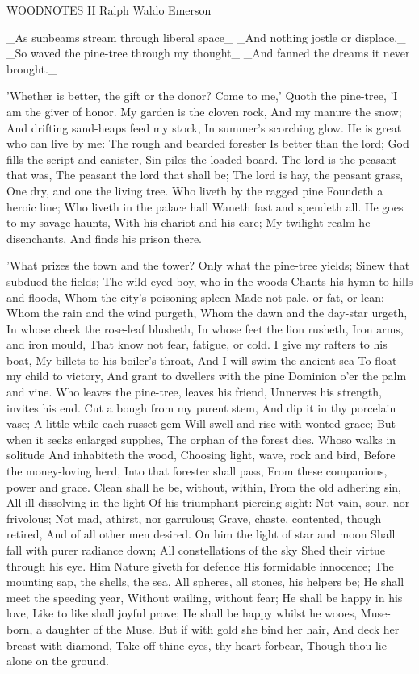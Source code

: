 WOODNOTES II
Ralph Waldo Emerson

_As sunbeams stream through liberal space_
_And nothing jostle or displace,_
_So waved the pine-tree through my thought_
_And fanned the dreams it never brought._

'Whether is better, the gift or the donor?
Come to me,'
Quoth the pine-tree,
'I am the giver of honor.
My garden is the cloven rock,
And my manure the snow;
And drifting sand-heaps feed my stock,
In summer's scorching glow.
He is great who can live by me:
The rough and bearded forester
Is better than the lord;
God fills the script and canister,
Sin piles the loaded board.
The lord is the peasant that was,
The peasant the lord that shall be;
The lord is hay, the peasant grass,
One dry, and one the living tree.
Who liveth by the ragged pine
Foundeth a heroic line;
Who liveth in the palace hall
Waneth fast and spendeth all.
He goes to my savage haunts,
With his chariot and his care;
My twilight realm he disenchants,
And finds his prison there.

'What prizes the town and the tower?
Only what the pine-tree yields;
Sinew that subdued the fields;
The wild-eyed boy, who in the woods
Chants his hymn to hills and floods,
Whom the city's poisoning spleen
Made not pale, or fat, or lean;
Whom the rain and the wind purgeth,
Whom the dawn and the day-star urgeth,
In whose cheek the rose-leaf blusheth,
In whose feet the lion rusheth,
Iron arms, and iron mould,
That know not fear, fatigue, or cold.
I give my rafters to his boat,
My billets to his boiler's throat,
And I will swim the ancient sea
To float my child to victory,
And grant to dwellers with the pine
Dominion o'er the palm and vine.
Who leaves the pine-tree, leaves his friend,
Unnerves his strength, invites his end.
Cut a bough from my parent stem,
And dip it in thy porcelain vase;
A little while each russet gem
Will swell and rise with wonted grace;
But when it seeks enlarged supplies,
The orphan of the forest dies.
Whoso walks in solitude
And inhabiteth the wood,
Choosing light, wave, rock and bird,
Before the money-loving herd,
Into that forester shall pass,
From these companions, power and grace.
Clean shall he be, without, within,
From the old adhering sin,
All ill dissolving in the light
Of his triumphant piercing sight:
Not vain, sour, nor frivolous;
Not mad, athirst, nor garrulous;
Grave, chaste, contented, though retired,
And of all other men desired.
On him the light of star and moon
Shall fall with purer radiance down;
All constellations of the sky
Shed their virtue through his eye.
Him Nature giveth for defence
His formidable innocence;
The mounting sap, the shells, the sea,
All spheres, all stones, his helpers be;
He shall meet the speeding year,
Without wailing, without fear;
He shall be happy in his love,
Like to like shall joyful prove;
He shall be happy whilst he wooes,
Muse-born, a daughter of the Muse.
But if with gold she bind her hair,
And deck her breast with diamond,
Take off thine eyes, thy heart forbear,
Though thou lie alone on the ground.

